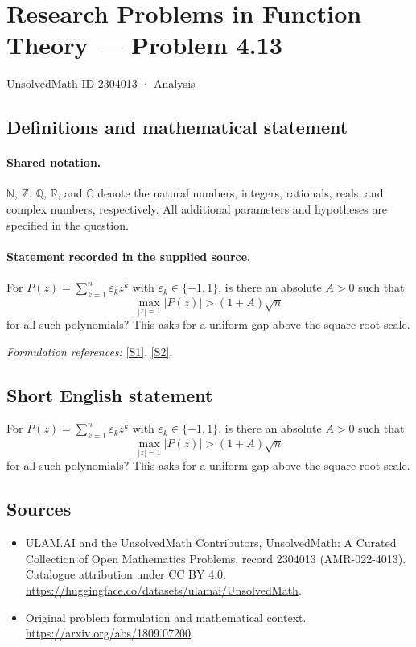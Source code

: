 \documentclass[11pt]{article}
\newcommand{\sref}[2]{\hyperlink{source:#1:#2}{[S#2]}}
\begin{document}
\setcounter{section}{2304012}
\section{Research Problems in Function Theory — Problem 4.13}\label{2304013}
{\small UnsolvedMath ID 2304013 · Analysis}
\subsection{Definitions and mathematical statement}

\paragraph{Shared notation.}$\mathbb N$, $\mathbb Z$, $\mathbb Q$, $\mathbb R$, and $\mathbb C$ denote the natural numbers, integers, rationals, reals, and complex numbers, respectively. All additional parameters and hypotheses are specified in the question.


\paragraph{Statement recorded in the supplied source.}
For $P(z)=\sum_{k=1}^n\varepsilon_kz^k$ with $\varepsilon_k\in\{-1,1\}$, is there an absolute $A>0$ such that
\[\max_{|z|=1}|P(z)|>(1+A)\sqrt n\]
for all such polynomials? This asks for a uniform gap above the square-root scale.
\par\smallskip\textit{Formulation references:} \sref{2304013}{1}, \sref{2304013}{2}.
\subsection{Short English statement}
For $P(z)=\sum_{k=1}^n\varepsilon_kz^k$ with $\varepsilon_k\in\{-1,1\}$, is there an absolute $A>0$ such that
\[\max_{|z|=1}|P(z)|>(1+A)\sqrt n\]
for all such polynomials? This asks for a uniform gap above the square-root scale.
\subsection{Sources}
\begin{itemize}
\item[\hypertarget{source:2304013:1}{S1}] ULAM.AI and the UnsolvedMath Contributors, UnsolvedMath: A Curated Collection of Open Mathematics Problems, record 2304013 (AMR-022-4013). Catalogue attribution under CC BY 4.0.
\url{https://huggingface.co/datasets/ulamai/UnsolvedMath}.
\item[\hypertarget{source:2304013:2}{S2}] Original problem formulation and mathematical context.
\url{https://arxiv.org/abs/1809.07200}.
\end{itemize}
\label{end:2304013}
\end{document}

